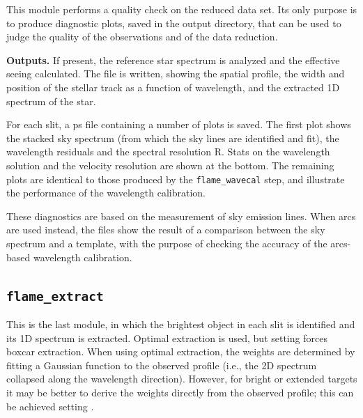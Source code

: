 \documentclass[a4paper]{article}
\begin{document}
\begin{sloppypar}
This module performs a quality check on the reduced data set. Its only purpose is to produce diagnostic plots, saved in the output directory, that can be used to judge the quality of the observations and of the data reduction.

\medskip
\noindent
\textbf{Outputs.} If present, the reference star spectrum is analyzed and the effective seeing calculated. The file  is written, showing the spatial profile, the width and position of the stellar track as a function of wavelength, and the extracted 1D spectrum of the star.

For each slit, a ps file containing a number of plots is saved. The first plot shows the stacked sky spectrum (from which the sky lines are identified and fit), the wavelength residuals and the spectral resolution R. Stats on the wavelength solution and the velocity resolution are shown at the bottom. The remaining plots are identical to those produced by the \texttt{flame\_wavecal} step, and illustrate the performance of the wavelength calibration.

These diagnostics are based on the measurement of sky emission lines. When arcs are used instead, the files show the result of a comparison between the sky spectrum and a template, with the purpose of checking the accuracy of the arcs-based wavelength calibration.



\subsection{\texttt{flame\_extract}}
\label{sec:extract}

This is the last module, in which the brightest object in each slit is identified and its 1D spectrum is extracted. Optimal extraction is used, but setting  forces boxcar extraction. When using optimal extraction, the weights are determined by fitting a Gaussian function to the observed profile (i.e., the 2D spectrum collapsed along the wavelength direction). However, for bright or extended targets it may be better to derive the weights directly from the observed profile; this can be achieved setting .


\end{sloppypar}
\end{document}
